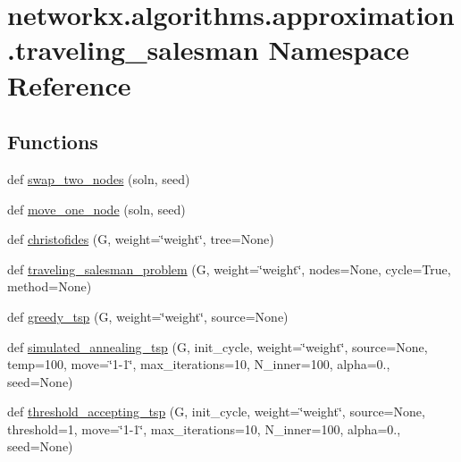 \hypertarget{namespacenetworkx_1_1algorithms_1_1approximation_1_1traveling__salesman}{}\section{networkx.\+algorithms.\+approximation.\+traveling\+\_\+salesman Namespace Reference}
\label{namespacenetworkx_1_1algorithms_1_1approximation_1_1traveling__salesman}
\subsection*{Functions}
\begin{DoxyCompactItemize}
\item 
def \hyperlink{namespacenetworkx_1_1algorithms_1_1approximation_1_1traveling__salesman_a0fdde926c7d59c76a087e4b4ee5502e1}{swap\+\_\+two\+\_\+nodes} (soln, seed)
\item 
def \hyperlink{namespacenetworkx_1_1algorithms_1_1approximation_1_1traveling__salesman_af9505dd8c1940e16144026f1c44fbdb0}{move\+\_\+one\+\_\+node} (soln, seed)
\item 
def \hyperlink{namespacenetworkx_1_1algorithms_1_1approximation_1_1traveling__salesman_af8867e0807759613f7483fd75dbc8f05}{christofides} (G, weight=\char`\"{}weight\char`\"{}, tree=None)
\item 
def \hyperlink{namespacenetworkx_1_1algorithms_1_1approximation_1_1traveling__salesman_a2c82677b10d52786a34aa0ea42f8b1d2}{traveling\+\_\+salesman\+\_\+problem} (G, weight=\char`\"{}weight\char`\"{}, nodes=None, cycle=True, method=None)
\item 
def \hyperlink{namespacenetworkx_1_1algorithms_1_1approximation_1_1traveling__salesman_a4cf9c28bf0139df1980bb84bc58a90d7}{greedy\+\_\+tsp} (G, weight=\char`\"{}weight\char`\"{}, source=None)
\item 
def \hyperlink{namespacenetworkx_1_1algorithms_1_1approximation_1_1traveling__salesman_afbaf80a5dab2307652409b12bf33ca72}{simulated\+\_\+annealing\+\_\+tsp} (G, init\+\_\+cycle, weight=\char`\"{}weight\char`\"{}, source=None, temp=100, move=\char`\"{}1-\/1\char`\"{}, max\+\_\+iterations=10, N\+\_\+inner=100, alpha=0., seed=None)
\item 
def \hyperlink{namespacenetworkx_1_1algorithms_1_1approximation_1_1traveling__salesman_aada31f6fee5230024ff9b5f1c27118aa}{threshold\+\_\+accepting\+\_\+tsp} (G, init\+\_\+cycle, weight=\char`\"{}weight\char`\"{}, source=None, threshold=1, move=\char`\"{}1-\/1\char`\"{}, max\+\_\+iterations=10, N\+\_\+inner=100, alpha=0., seed=None)
\end{DoxyCompactItemize}


